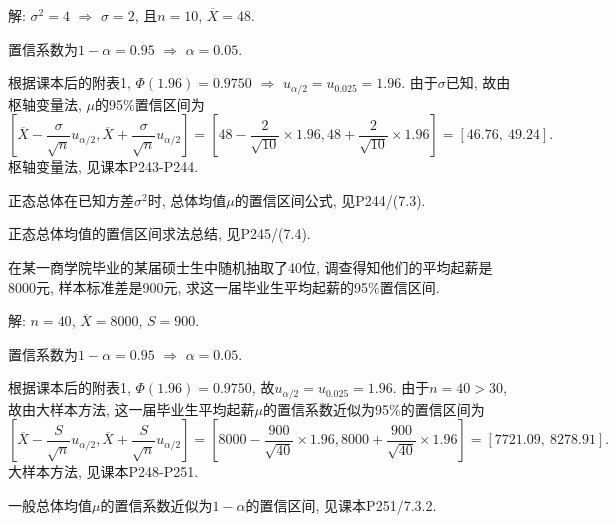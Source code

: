 \documentclass[standard]{ExBook}
\renewenvironment{shaded}{%
  \def\FrameCommand{\fboxsep=\FrameSep \colorbox{shadecolor}}%
  \MakeFramed{\advance\hsize-\width \FrameRestore}%
}{%
  \endMakeFramed
}
\begin{document}
\begin{qitems}
\vspace{\dimexpr2.5cm-5em\relax}

解: $\sigma^2=4$ $\Longrightarrow$ $\sigma=2$, 且$n=10$, $\overline{X}=48$.

置信系数为$1-\alpha=0.95$ $\Longrightarrow$ $\alpha=0.05$.

根据课本后的附表1, $\Phi(1.96)=0.9750$ $\Longrightarrow$ $u_{\alpha/2}=u_{0.025}=1.96$. 由于$\sigma$已知, 故由枢轴变量法, $\mu$的95\%置信区间为
$$
\left[
\overline{X}-\frac{\sigma}{\sqrt{n}}u_{\alpha/2},
\overline{X}+\frac{\sigma}{\sqrt{n}}u_{\alpha/2}
\right]
=
\left[
48-\frac{2}{\sqrt{10}}\times1.96,
48+\frac{2}{\sqrt{10}}\times1.96
\right]
=
[46.76,\ 49.24].
$$
\textcolor{themeColor}{\selectfont {} 枢轴变量法, 见课本P243-P244.}

\textcolor{themeColor}{\selectfont {} 
正态总体在已知方差$\sigma^2$时, 总体均值$\mu$的置信区间公式, 见P244/(7.3).}

\textcolor{themeColor}{\selectfont {} 正态总体均值的置信区间求法总结, 见P245/(7.4).}

\vspace{2.5cm-5em}

    \begin{bbox}
    \begin{shaded}
        \qitem
在某一商学院毕业的某届硕士生中随机抽取了40位, 调查得知他们的平均起薪是8000元, 样本标准差是900元, 求这一届毕业生平均起薪的95\%置信区间.
    \end{shaded}
    \end{bbox}

\vspace{\dimexpr2.5cm-5em\relax}

解: $n=40$, $\overline{X}=8000$, $S=900$.

置信系数为$1-\alpha=0.95$ $\Longrightarrow$ $\alpha=0.05$.

根据课本后的附表1, $\Phi(1.96)=0.9750$, 故$u_{\alpha/2}=u_{0.025}=1.96$. 由于$n=40>30$, 故由大样本方法, 这一届毕业生平均起薪$\mu$的置信系数近似为95\%的置信区间为
$$
\left[
\overline{X}-\frac{S}{\sqrt{n}}u_{\alpha/2},
\overline{X}+\frac{S}{\sqrt{n}}u_{\alpha/2}
\right]
=
\left[
8000-\frac{900}{\sqrt{40}}\times1.96,
8000+\frac{900}{\sqrt{40}}\times1.96
\right]
=
[7721.09,\ 8278.91].
$$
\textcolor{themeColor}{\selectfont {} 大样本方法, 见课本P248-P251.}

\textcolor{themeColor}{\selectfont {} 
一般总体均值$\mu$的置信系数近似为$1-\alpha$的置信区间, 见课本P251/7.3.2.}

\vspace{2.5cm-5em}


\end{qitems}
\end{document}
